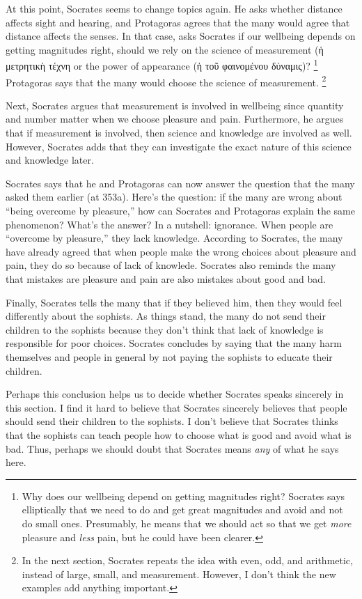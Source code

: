 \documentclass[12pt,letterpaper]{article}
\begin{document}
At this point, Socrates seems to change topics again.
He asks whether distance affects sight and hearing, and Protagoras agrees that the many would agree that distance affects the senses.
In that case, asks Socrates if our wellbeing depends on getting magnitudes right, should we rely on the science of measurement (\textgreek{ἡ μετρητικὴ τέχνη} or the power of appearance (\textgreek{ἡ τοῦ φαινομένου δύναμις})?%
\footnote{Why does our wellbeing depend on getting magnitudes right?
Socrates says elliptically that we need to do and get great magnitudes and avoid and not do small ones.
Presumably, he means that we should act so that we get \textit{more} pleasure and \textit{less} pain, but he could have been clearer.}
Protagoras says that the many would choose the science of measurement.%
\footnote{In the next section, Socrates repeats the idea with even, odd, and arithmetic, instead of large, small, and measurement.
However, I don't think the new examples add anything important.}

Next, Socrates argues that measurement is involved in wellbeing since quantity and number matter when we choose pleasure and pain.
Furthermore, he argues that if measurement is involved, then science and knowledge are involved as well.
However, Socrates adds that they can investigate the exact nature of this science and knowledge later.

Socrates says that he and Protagoras can now answer the question that the many asked them earlier (at 353a).
Here's the question: if the many are wrong about ``being overcome by pleasure,'' how can Socrates and Protagoras explain the same phenomenon?
What's the answer?
In a nutshell: ignorance.
When people are ``overcome by pleasure,'' they lack knowledge.
According to Socrates, the many have already agreed that when people make the wrong choices about pleasure and pain, they do so because of lack of knowlede.
Socrates also reminds the many that mistakes are pleasure and pain are also mistakes about good and bad.

Finally, Socrates tells the many that if they believed him, then they would feel differently about the sophists.
As things stand, the many do not send their children to the sophists because they don't think that lack of knowledge is responsible for poor choices.
Socrates concludes by saying that the many harm themselves and people in general by not paying the sophists to educate their children.

Perhaps this conclusion helps us to decide whether Socrates speaks sincerely in this section.
I find it hard to believe that Socrates sincerely believes that people should send their children to the sophists.
I don't believe that Socrates thinks that the sophists can teach people how to choose what is good and avoid what is bad.
Thus, perhaps we should doubt that Socrates means \textit{any} of what he says here.
\end{document}
